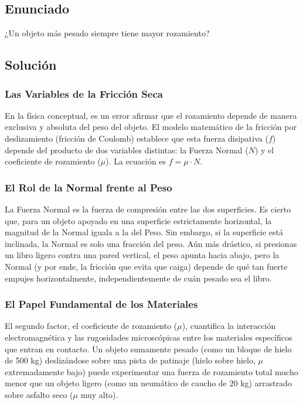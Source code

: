 \documentclass[12pt]{article}
\begin{document}
\subsection*{Enunciado}
¿Un objeto más pesado siempre tiene mayor rozamiento?

\subsection*{Solución}

\subsubsection*{Las Variables de la Fricción Seca}
En la física conceptual, es un error afirmar que el rozamiento depende de manera exclusiva y absoluta del peso del objeto. El modelo matemático de la fricción por deslizamiento (fricción de Coulomb) establece que esta fuerza disipativa ($f$) depende del producto de dos variables distintas: la Fuerza Normal ($N$) y el coeficiente de rozamiento ($\mu$). La ecuación es $f = \mu \cdot N$.

\subsubsection*{El Rol de la Normal frente al Peso}
La Fuerza Normal es la fuerza de compresión entre las dos superficies. Es cierto que, para un objeto apoyado en una superficie estrictamente horizontal, la magnitud de la Normal iguala a la del Peso. Sin embargo, si la superficie está inclinada, la Normal es solo una fracción del peso. Aún más drástico, si presionas un libro ligero contra una pared vertical, el peso apunta hacia abajo, pero la Normal (y por ende, la fricción que evita que caiga) depende de qué tan fuerte empujes horizontalmente, independientemente de cuán pesado sea el libro.

\subsubsection*{El Papel Fundamental de los Materiales}
El segundo factor, el coeficiente de rozamiento ($\mu$), cuantifica la interacción electromagnética y las rugosidades microscópicas entre los materiales específicos que entran en contacto. Un objeto sumamente pesado (como un bloque de hielo de 500 kg) deslizándose sobre una pista de patinaje (hielo sobre hielo, $\mu$ extremadamente bajo) puede experimentar una fuerza de rozamiento total mucho menor que un objeto ligero (como un neumático de caucho de 20 kg) arrastrado sobre asfalto seco ($\mu$ muy alto).
\end{document}
